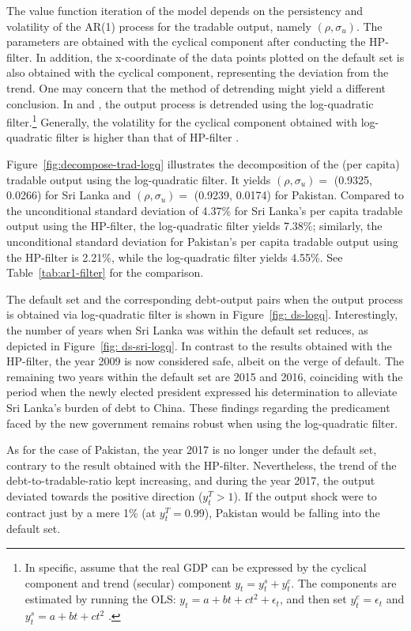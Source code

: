 The value function iteration of the model depends on the persistency and volatility of the AR(1) process for the tradable output, namely $(\rho, \sigma_u)$. The parameters are obtained with the cyclical component after conducting the HP-filter. In addition, the x-coordinate of the data points plotted on the default set is also obtained with the cyclical component, representing the deviation from the trend. One may concern that the method of detrending might yield a different conclusion. In \citet{Na-18} and \cite{Hinrichsen_2020-chapter4}, the output process is detrended using the log-quadratic filter.\footnote{
    In specific, assume that the real GDP can be expressed by the cyclical component and trend (secular) component $y_t = y^s_t + y^c_t$. The components are estimated by running the OLS: $y_t = a + bt + ct^2 + \epsilon_t$, and then set $y^c_t = \epsilon_t$ and $y^s_t = a + bt + ct^2$ \citep{Uribe-Schmitt-Grohe-textbook}.
}
Generally, the volatility for the cyclical component obtained with log-quadratic filter is higher than that of HP-filter \citep{Uribe-Schmitt-Grohe-textbook}.

Figure~\ref{fig:decompose-trad-logq} illustrates the decomposition of the (per capita) tradable output using the log-quadratic filter. It yields $(\rho, \sigma_u)=$ (0.9325, 0.0266) for Sri Lanka and $(\rho, \sigma_u)=$ (0.9239, 0.0174) for Pakistan. Compared to the unconditional standard deviation of 4.37\% for Sri Lanka's per capita tradable output using the HP-filter, the log-quadratic filter yields 7.38\%; similarly, the unconditional standard deviation for Pakistan's per capita tradable output using the HP-filter is 2.21\%, while the log-quadratic filter yields 4.55\%.
See Table~\ref{tab:ar1-filter} for the comparison.

The default set and the corresponding debt-output pairs when the output process is obtained via log-quadratic filter is shown in Figure~\ref{fig: ds-logq}. Interestingly, the number of years when Sri Lanka was within the default set reduces, as depicted in Figure~\ref{fig: ds-sri-logq}.
In contrast to the results obtained with the HP-filter, the year 2009 is now considered safe, albeit on the verge of default. The remaining two years within the default set are 2015 and 2016, coinciding with the period when the newly elected president expressed his determination to alleviate Sri Lanka's burden of debt to China. These findings regarding the predicament faced by the new government remains robust when using the log-quadratic filter.

As for the case of Pakistan, the year 2017 is no longer under the default set, contrary to the result obtained with the HP-filter. Nevertheless, the trend of the debt-to-tradable-ratio kept increasing, and during the year 2017, the output deviated towards the positive direction ($y^T_t > 1$). If the output shock were to contract just by a mere 1\% (at $y^T_t = 0.99$), Pakistan would be falling into the default set.